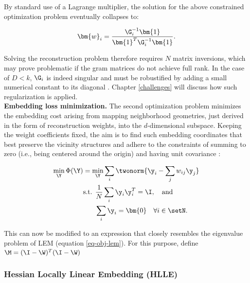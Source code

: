 By standard use of a Lagrange multiplier, the solution for the above constrained optimization problem eventually collapses to:

\begin{equation}
  \bm{w}_i = \frac{\G_i^{-1}\bm{1}}{\bm{1}^T \G_i^{-1}\bm{1}}.
  \label{eq-obj-lle-sol}
\end{equation}

Solving the reconstruction problem therefore requires $N$ matrix inversions, 
which may prove problematic if the gram matrices do not achieve full rank.
In the case of $D < k$, $\G_i$ is indeed singular and must be robustified by 
adding a small numerical constant to its diagonal \citep{ghojoghetal2020}.
Chapter \ref{challenges} will discuss how such regularization is applied.
\\

\textbf{Embedding loss minimization.}
The second optimization problem minimizes the embedding cost arising from 
mapping neighborhood geometries, just derived in the form of reconstruction 
weights, into the $d$-dimensional subspace.
Keeping the weight coefficients fixed, the aim is to find such embedding 
coordinates that best preserve the vicinity structures and adhere to the 
constraints of summing to zero (i.e., being centered around the origin) and 
having unit covariance \citep{roweissaul2000}:

\begin{equation}
  \begin{split}
    \min_{\Y} \Phi(\Y) &= \min_{\Y} \sum_i \twonorm{\y_i - \sum_j w_{ij} \y_j}\\
    & \text{s.t. } \frac{1}{N} \sum_i \y_i \y_i^T = \I, \quad \text{and} \\
    & \phantom{\text{s.t. }} \sum_i \y_i = \bm{0} \quad \forall i \in \setN. 
  \end{split}
  \label{eq-obj-lle-emb}
\end{equation}

This can now be modified to an expression that closely resembles the 
eigenvalue problem of LEM (equation \ref{eq-obj-lem}).
For this purpose, define $\M = (\I - \W)^T(\I - \W)$


\subsubsection{Hessian Locally Linear Embedding (HLLE)}
\label{hlle}


